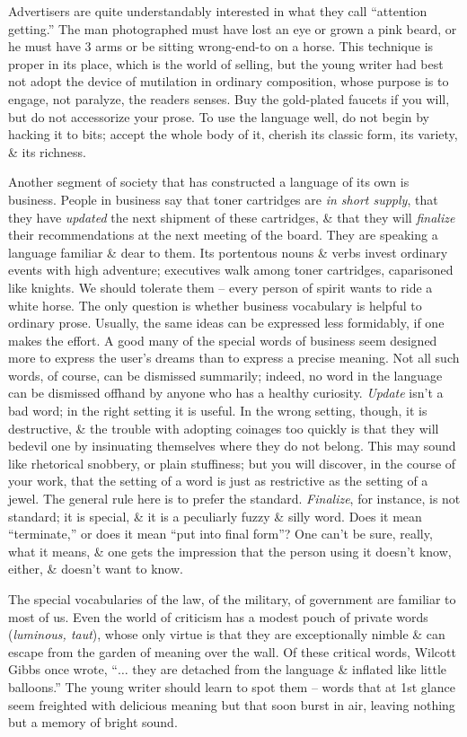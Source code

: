 \documentclass{article}
\begin{document}
Advertisers are quite understandably interested in what they call ``attention getting.'' The man photographed must have lost an eye or grown a pink beard, or he must have 3 arms or be sitting wrong-end-to on a horse. This technique is proper in its place, which is the world of selling, but the young writer had best not adopt the device of mutilation in ordinary composition, whose purpose is to engage, not paralyze, the readers senses. Buy the gold-plated faucets if you will, but do not accessorize your prose. To use the language well, do not begin by hacking it to bits; accept the whole body of it, cherish its classic form, its variety, \& its richness.

Another segment of society that has constructed a language of its own is business. People in business say that toner cartridges are {\it in short supply}, that they have {\it updated} the next shipment of these cartridges, \& that they will {\it finalize} their recommendations at the next meeting of the board. They are speaking a language familiar \& dear to them. Its portentous nouns \& verbs invest ordinary events with high adventure; executives walk among toner cartridges, caparisoned like knights. We should tolerate them -- every person of spirit wants to ride a white horse. The only question is whether business vocabulary is helpful to ordinary prose. Usually, the same ideas can be expressed less formidably, if one makes the effort. A good many of the special words of business seem designed more to express the user's dreams than to express a precise meaning. Not all such words, of course, can be dismissed summarily; indeed, no word in the language can be dismissed offhand by anyone who has a healthy curiosity. {\it Update} isn't a bad word; in the right setting it is useful. In the wrong setting, though, it is destructive, \& the trouble with adopting coinages too quickly is that they will bedevil one by insinuating themselves where they do not belong. This may sound like rhetorical snobbery, or plain stuffiness; but you will discover, in the course of your work, that the setting of a word is just as restrictive as the setting of a jewel. The general rule here is to prefer the standard. {\it Finalize}, for instance, is not standard; it is special, \& it is a peculiarly fuzzy \& silly word. Does it mean ``terminate,'' or does it mean ``put into final form''? One can't be sure, really, what it means, \& one gets the impression that the person using it doesn't know, either, \& doesn't want to know.

The special vocabularies of the law, of the military, of government are familiar to most of us. Even the world of criticism has a modest pouch of private words ({\it luminous, taut}), whose only virtue is that they are exceptionally nimble \& can escape from the garden of meaning over the wall. Of these critical words, Wilcott Gibbs once wrote, ``$\ldots$ they are detached from the language \& inflated like little balloons.'' The young writer should learn to spot them -- words that at 1st glance seem freighted with delicious meaning but that soon burst in air, leaving nothing but a memory of bright sound.
\end{document}
